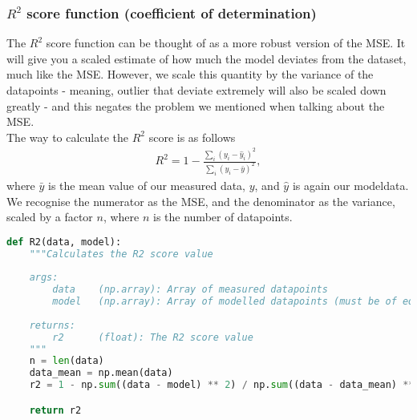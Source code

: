 \documentclass[../main.tex]{subfiles}
\begin{document}
\subsubsection{$R^2$ score function (coefficient of determination)}\label{refmethod:R2}
The $R^2$ score function can be thought of as a more robust version of the MSE. It will give you a scaled estimate of how much the model deviates from the dataset, much like the MSE. However, we scale this quantity by the variance of the datapoints - meaning, outlier that deviate extremely will also be scaled down greatly - and this negates the problem we mentioned when talking about the MSE. \\\indent The way to calculate the $R^2$ score is as follows
\begin{align*}
    R^2 = 1 - \frac{\sum_i(y_i - \hat y_i)^2}{\sum_i( y_i - \bar y)^2},
\end{align*}
where $\bar y$ is the mean value of our measured data, $y$, and $\hat y$ is again our modeldata. \\\indent We recognise the numerator as the MSE, and the denominator as the variance, scaled by a factor $n$, where $n$ is the number of datapoints. 
\newpage
\begin{lstlisting}[language=Python]
def R2(data, model):
    """Calculates the R2 score value
    
    args:
        data    (np.array): Array of measured datapoints
        model   (np.array): Array of modelled datapoints (must be of equal length as data)
    
    returns:
        r2      (float): The R2 score value
    """
    n = len(data)
    data_mean = np.mean(data)
    r2 = 1 - np.sum((data - model) ** 2) / np.sum((data - data_mean) ** 2)

    return r2
\end{lstlisting}
\label{code:R2_score}
\end{document}

